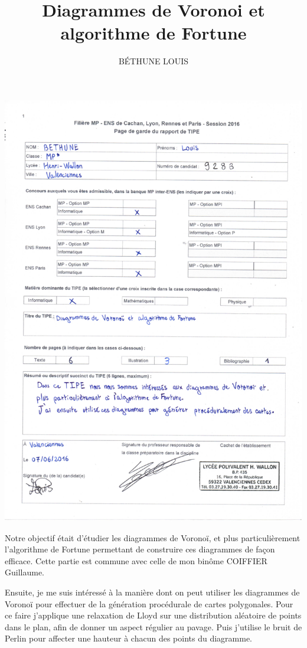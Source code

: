 \documentclass[a4paper, 10pt]{article}
\author{BÉTHUNE LOUIS}
\title{Diagrammes de Voronoi et algorithme de Fortune}
\begin{document}
\includegraphics[scale=0.75]{enteteTIPE.pdf} 
\maketitle 
Notre objectif était d'étudier les diagrammes de Voronoï, et plus particulièrement l'algorithme de Fortune permettant de construire ces diagrammes de façon efficace. Cette partie est commune avec celle de mon binôme COIFFIER Guillaume.  
  
Ensuite, je me suis intéressé à la manière dont on peut utiliser les diagrammes de Voronoï pour effectuer de la génération procédurale de cartes polygonales. Pour ce faire j'applique une relaxation de Lloyd sur une distribution aléatoire de points dans le plan, afin de donner un aspect régulier au pavage. Puis j'utilise le bruit de Perlin pour affecter une hauteur à chacun des points du diagramme.  
\end{document}
